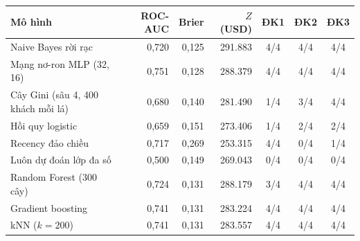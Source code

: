 \begin{tabular}{lrrrccc}
\toprule
Mô hình & ROC-AUC & Brier & $Z$ (USD) & ĐK1 & ĐK2 & ĐK3 \\
\midrule
Naive Bayes rời rạc & 0,720 & 0,125 & 291.883 & 4/4 & 4/4 & 4/4 \\
Mạng nơ-ron MLP (32, 16) & 0,751 & 0,128 & 288.379 & 4/4 & 4/4 & 4/4 \\
Cây Gini (sâu 4, 400 khách mỗi lá) & 0,680 & 0,140 & 281.490 & 1/4 & 3/4 & 4/4 \\
Hồi quy logistic & 0,659 & 0,151 & 273.406 & 1/4 & 2/4 & 2/4 \\
Recency đảo chiều & 0,717 & 0,269 & 253.315 & 4/4 & 0/4 & 1/4 \\
Luôn dự đoán lớp đa số & 0,500 & 0,149 & 269.043 & 0/4 & 0/4 & 0/4 \\
Random Forest (300 cây) & 0,724 & 0,131 & 288.179 & 3/4 & 4/4 & 4/4 \\
Gradient boosting & 0,741 & 0,131 & 283.224 & 4/4 & 4/4 & 4/4 \\
kNN ($k=200$) & 0,741 & 0,131 & 283.557 & 4/4 & 4/4 & 4/4 \\
\bottomrule
\end{tabular}
